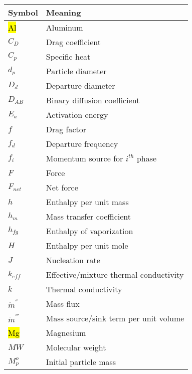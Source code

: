 \begin{table}[h!]
    \centering
    \begin{tabular}{w{c}{2cm} m{7cm}}
        \toprule
        Symbol & Meaning \\ 
        \midrule
        \hl{Al}                & Aluminum \\
        $C_D$               & Drag coefficient \\
        $C_p$               & Specific heat \\
        $d_p$               & Particle diameter\\
        $D_d$               & Departure diameter \\
        $D_{AB}$            & Binary diffusion coefficient \\
        $E_a$               & Activation energy \\
        $f$                 & Drag factor \\
        $f_d$               & Departure frequency \\
        $f_i$               & Momentum source for $i^{th}$ phase \\
        $F$                 & Force \\
        $F_{net}$           & Net force \\
        $h$                 & Enthalpy per unit mass \\
        $h_m$               & Mass transfer coefficient\\
        $h_{fg}$            & Enthalpy of vaporization\\
        $H$                 & Enthalpy per unit mole \\
        $J$                 & Nucleation rate \\
        $k_{eff}$           & Effective/mixture thermal conductivity\\
        $k$                 & Thermal conductivity \\
        $\dot{m}^{''}$      & Mass flux \\
        $\dot{m}^{'''}$     & Mass source/sink term per unit volume\\
        \hl{Mg}                & Magnesium \\
        $MW$                & Molecular weight\\
        $M^o_p$             & Initial particle mass \\
        
        \bottomrule
    \end{tabular}
    \label{tab:Nomenclature}
\end{table}

